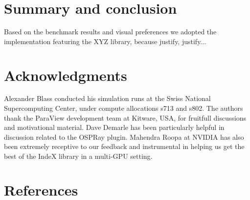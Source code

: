 \documentclass[final,5p,times,twocolumn]{elsarticle}
\begin{document}
\section{Summary and conclusion}

Based on the benchmark results and visual preferences we adopted the implementation
featuring the XYZ library, because justify, justify...



\section*{Acknowledgments}

Alexander Blass conducted his simulation runs at the Swiss National Supercomputing Center, under compute allocations s713 and s802. The authors thank the ParaView development team at Kitware, USA, for fruitfull discussions and motivational material. Dave Demarle has been particularly helpful in discussion related to the OSPRay plugin. Mahendra Roopa ‎at NVIDIA has also been extremely receptive to our feedback and instrumental in helping us get the best of the IndeX library in a multi-GPU setting.

\section*{References}
 

\end{document}
